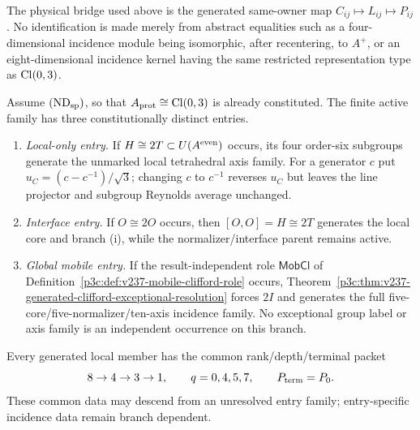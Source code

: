\documentclass[12pt,a4paper]{article}
\begin{document}
\begin{remark}
\label{p3c:rem:v237-no-abstract-module-promotion}
The physical bridge used above is the generated same-owner map
\(C_{ij}\mapsto L_{ij}\mapsto P_{ij}\).  No identification is made merely
from abstract equalities such as a four-dimensional incidence module being
isomorphic, after recentering, to \(A^+\), or an eight-dimensional incidence
kernel having the same restricted representation type as \(\operatorname{Cl}(0,3)\).
\end{remark}

\begin{theorem}
\label{p3c:thm:v236-exceptional-active-fork}
Assume \((\mathrm{ND}_{\rm sp})\), so that
\(A_{\rm prot}\cong\operatorname{Cl}(0,3)\) is already constituted.  The finite active
family has three constitutionally distinct entries.
\begin{enumerate}[label=(\roman*),leftmargin=2.2em]
\item \emph{Local-only entry.}  If \(H\cong2T\subset U(A^{\rm even})\)
occurs, its four order-six subgroups generate the unmarked local tetrahedral
axis family.  For a generator \(c\) put \(u_C=(c-c^{-1})/\sqrt3\); changing
\(c\) to \(c^{-1}\) reverses \(u_C\) but leaves the line projector and subgroup
Reynolds average unchanged.
\item \emph{Interface entry.}  If \(O\cong2O\) occurs, then
\([O,O]=H\cong2T\) generates the local core and branch (i), while the
normalizer/interface parent remains active.
\item \emph{Global mobile entry.}  If the result-independent role
\(\mathsf{MobCl}\) of Definition~\ref{p3c:def:v237-mobile-clifford-role}
occurs, Theorem~\ref{p3c:thm:v237-generated-clifford-exceptional-resolution}
forces \(2I\) and generates the full five-core/five-normalizer/ten-axis
incidence family.  No exceptional group label or axis family is an independent
occurrence on this branch.
\end{enumerate}
Every generated local member has the common rank/depth/terminal packet
\[
 8\to4\to3\to1,\qquad q=0,4,5,7,\qquad P_{\rm term}=P_0.
\]
These common data may descend from an unresolved entry family; entry-specific
incidence data remain branch dependent.
\end{theorem}
\end{document}
